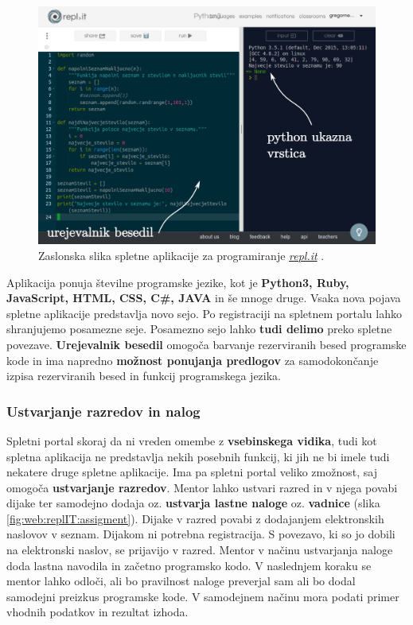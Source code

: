 \begin{figure}[h!]
  \centering
    \includegraphics [width=0.65\linewidth, keepaspectratio =
   1] {./images/sc_web/replIT_main-v01.jpg}
   \caption{Zaslonska slika spletne aplikacije za programiranje
     \emph{\href{https://repl.it/}{repl.it}} \cite{web:replIT}.}
    \label{fig:web:replIT}
\end{figure}

Aplikacija ponuja številne programske jezike, kot je \textbf{Python3,
  Ruby, JavaScript, HTML, CSS, C\#, JAVA} in še mnoge druge. Vsaka nova
pojava spletne aplikacije predstavlja novo sejo. Po registraciji na
spletnem portalu lahko shranjujemo posamezne seje. Posamezno sejo
lahko \textbf{tudi delimo} preko spletne povezave. \textbf{Urejevalnik
  besedil} omogoča barvanje rezerviranih besed programske kode in ima napredno
\textbf{možnost ponujanja predlogov} za samodokončanje izpisa
rezerviranih besed in funkcij programskega jezika.

\subsubsection{Ustvarjanje razredov in nalog}
\label{sec:ustvarjanje_raz_nalog}

Spletni portal skoraj da ni vreden omembe z \textbf{vsebinskega
  vidika}, tudi kot spletna aplikacija ne predstavlja nekih posebnih
funkcij, ki jih ne bi imele tudi nekatere druge spletne aplikacije. Ima
pa spletni portal veliko zmožnost, saj omogoča \textbf{ustvarjanje
  razredov}. Mentor lahko ustvari razred in v njega povabi dijake ter
samodejno dodaja oz. \textbf{ustvarja lastne naloge}
oz. \textbf{vadnice} (slika \ref{fig:web:replIT:assigment}). Dijake v
razred povabi z dodajanjem elektronskih naslovov v seznam. Dijakom ni potrebna
registracija. S povezavo, ki so jo dobili na elektronski naslov, se prijavijo v
razred. Mentor v načinu ustvarjanja naloge doda lastna navodila in
začetno programsko kodo. V naslednjem koraku se mentor lahko odloči,
ali bo pravilnost naloge preverjal sam ali bo dodal samodejni
preizkus programske kode. V samodejnem načinu mora podati primer
vhodnih podatkov in rezultat izhoda.

